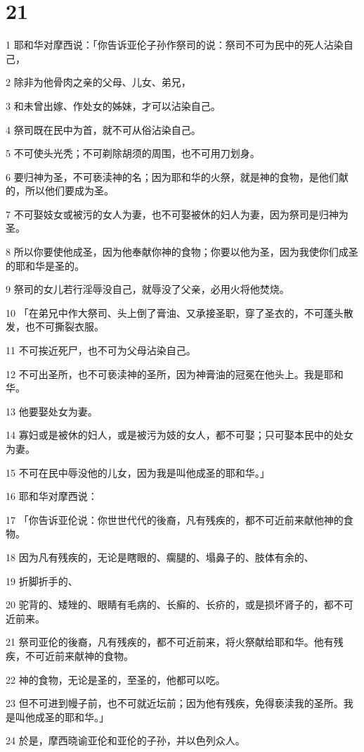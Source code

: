 \chapter{21}

\par 1 耶和华对摩西说：「你告诉亚伦子孙作祭司的说：祭司不可为民中的死人沾染自己，
\par 2 除非为他骨肉之亲的父母、儿女、弟兄，
\par 3 和未曾出嫁、作处女的姊妹，才可以沾染自己。
\par 4 祭司既在民中为首，就不可从俗沾染自己。
\par 5 不可使头光秃；不可剃除胡须的周围，也不可用刀划身。
\par 6 要归神为圣，不可亵渎神的名；因为耶和华的火祭，就是神的食物，是他们献的，所以他们要成为圣。
\par 7 不可娶妓女或被污的女人为妻，也不可娶被休的妇人为妻，因为祭司是归神为圣。
\par 8 所以你要使他成圣，因为他奉献你神的食物；你要以他为圣，因为我使你们成圣的耶和华是圣的。
\par 9 祭司的女儿若行淫辱没自己，就辱没了父亲，必用火将他焚烧。
\par 10 「在弟兄中作大祭司、头上倒了膏油、又承接圣职，穿了圣衣的，不可蓬头散发，也不可撕裂衣服。
\par 11 不可挨近死尸，也不可为父母沾染自己。
\par 12 不可出圣所，也不可亵渎神的圣所，因为神膏油的冠冕在他头上。我是耶和华。
\par 13 他要娶处女为妻。
\par 14 寡妇或是被休的妇人，或是被污为妓的女人，都不可娶；只可娶本民中的处女为妻。
\par 15 不可在民中辱没他的儿女，因为我是叫他成圣的耶和华。」
\par 16 耶和华对摩西说：
\par 17 「你告诉亚伦说：你世世代代的後裔，凡有残疾的，都不可近前来献他神的食物。
\par 18 因为凡有残疾的，无论是瞎眼的、瘸腿的、塌鼻子的、肢体有余的、
\par 19 折脚折手的、
\par 20 驼背的、矮矬的、眼睛有毛病的、长癣的、长疥的，或是损坏肾子的，都不可近前来。
\par 21 祭司亚伦的後裔，凡有残疾的，都不可近前来，将火祭献给耶和华。他有残疾，不可近前来献神的食物。
\par 22 神的食物，无论是圣的，至圣的，他都可以吃。
\par 23 但不可进到幔子前，也不可就近坛前；因为他有残疾，免得亵渎我的圣所。我是叫他成圣的耶和华。」
\par 24 於是，摩西晓谕亚伦和亚伦的子孙，并以色列众人。

